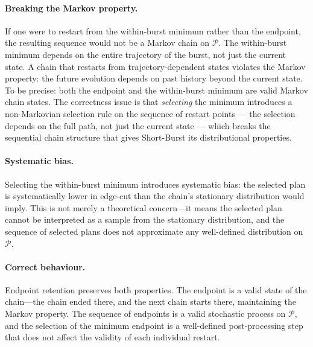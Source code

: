 \paragraph{Breaking the Markov property.}
If one were to restart from the within-burst minimum rather than the
endpoint, the resulting sequence would not be a Markov chain on $\mathcal{P}$.
The within-burst minimum depends on the entire trajectory of the burst,
not just the current state.
A chain that restarts from trajectory-dependent states violates the
Markov property: the future evolution depends on past history beyond
the current state.
To be precise: both the endpoint and the within-burst minimum are valid
Markov chain states. The correctness issue is that \emph{selecting} the
minimum introduces a non-Markovian selection rule on the sequence of
restart points --- the selection depends on the full path, not just the
current state --- which breaks the sequential chain structure that gives
Short-Burst its distributional properties.

\paragraph{Systematic bias.}
Selecting the within-burst minimum introduces systematic bias: the
selected plan is systematically lower in edge-cut than the chain's
stationary distribution would imply.
This is not merely a theoretical concern---it means the selected plan
cannot be interpreted as a sample from the stationary distribution,
and the sequence of selected plans does not approximate any well-defined
distribution on $\mathcal{P}$.

\paragraph{Correct behaviour.}
Endpoint retention preserves both properties.
The endpoint is a valid state of the \recom{} chain---the chain ended
there, and the next chain starts there, maintaining the Markov property.
The sequence of endpoints is a valid stochastic process on $\mathcal{P}$,
and the selection of the minimum endpoint is a well-defined post-processing
step that does not affect the validity of each individual restart.
